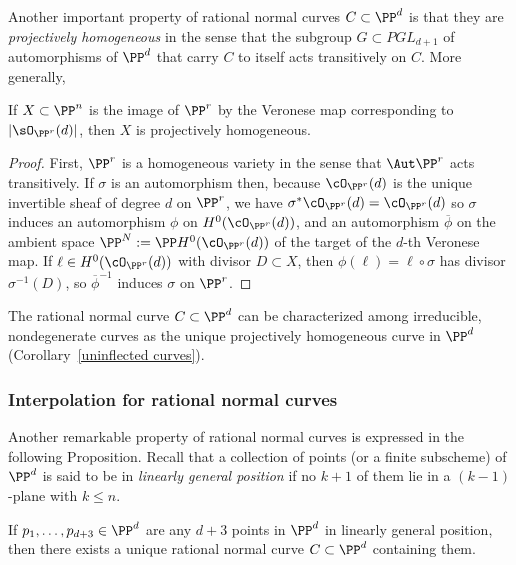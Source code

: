 Another important property of rational normal curves $C \subset \PP^d$ is that they are \emph{projectively homogeneous} in the sense that the subgroup $G\subset PGL_{d+1}$ of automorphisms of $\PP^d$ that carry $C$ to itself acts transitively on $C$. More generally,

\begin{proposition}\label{Veronese is projectively homogeneous}
If $X\subset \PP^n$ is the image of $\PP^r$ by the Veronese map corresponding to $|\sO_{\PP^r}(d)|$, then $X$ is projectively homogeneous.
\end{proposition}
\begin{proof}
First, $\PP^r$ is a homogeneous variety in the sense that $\Aut \PP^r$ acts transitively. If $\sigma$ is an automorphism then,
 because $\cO_{\PP^r}(d)$ is the unique
invertible sheaf of degree $d$ on $\PP^r$,  we have $\sigma^*\cO_{\PP^r}(d) = \cO_{\PP^r}(d)$ so $\sigma$ induces an automorphism $\phi$ on $H^0(\cO_{\PP^r}(d))$, and an automorphism $\overline \phi$ on the ambient space 
$\PP^{N} := \PP H^0(\cO_{\PP^r}(d))$ of the target of the $d$-th Veronese map. If $\ell \in H^0(\cO_{\PP^r}(d))$
 with divisor $D\subset X$, then $\phi(\ell) = \ell \circ \sigma$ has divisor $\sigma^{-1}(D)$, so $\overline\phi^{-1}$ induces $\sigma$ on $\PP^r$. 
\end{proof}

The rational normal curve $C \subset \PP^d$ can  be characterized among irreducible, nondegenerate curves as the unique projectively homogeneous curve in $\PP^d$ (Corollary~\ref{uninflected curves}).

\subsubsection{Interpolation for rational normal curves}\label{def of linearly general}

Another remarkable property of rational normal curves is expressed in the following Proposition. Recall that a collection of points (or a finite subscheme)
of $\PP^d$ is said to be in \emph{linearly general position} if no $k+1$ of them lie in a $(k-1)$-plane with $k\leq n$. 

\begin{proposition}\label{points on rnc}
If $p_1,\dots, p_{d+3} \in \PP^d$ are any $d+3$ points in $\PP^d$ in linearly general position, then there exists a unique rational normal curve $C \subset \PP^d$ containing them.
 \end{proposition}

